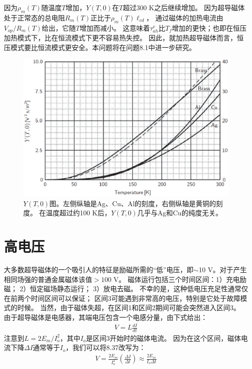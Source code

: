 因为$\rho_m(T)$随温度$T$增加，$Y(T,0)$在$T$超过300 K之后继续增加。
因为超导磁体处于正常态的总电阻$R_m(T)$正比于$\rho_m(T)\ell_{cd}$，
通过磁体的加热电流由$V_{op}/R_m(T)$给出，它随$T$增加而减小。
这意味着$\tau_{ah}^v$比$T_f$增加的更快；也即在恒压加热模式下，比在恒流模式下更不容易热失控。
因此，就加热超导磁体而言，恒压模式要比恒流模式更安全。本问题将在问题8.1中进一步研究。

\begin{figure}
	\centering
	\includegraphics[scale=0.6]{chpt8/figs/fig8.6.eps}
	\caption{$Y(T,0)$图。左侧纵轴是Ag、Cu、Al的刻度，右侧纵轴是黄铜的刻度。
	在温度超过约100 K后，$Y(T,0)$几乎与Ag和Cu的纯度无关。}
\end{figure}



\section{高电压}
大多数超导磁体的一个吸引人的特征是励磁所需的“低”电压，即$\sim$10 V。对于产生相同场强的普通金属磁体该值$>100$ V。
磁体运行包括三个时间区间：1）充电励磁； 2）恒定磁场静态运行； 3）放电去磁。 
不幸的是，这种低电压充足性通常仅在前两个时间区间可以保证；
区间3可能遇到非常高的电压，特别是它处于故障模式的时候。
 当然，由于磁体失超，在区间1和区间2期间可能会突然进入区间3。
 由于超导磁体是电感器，其端电压包含一个电感分量，由下式给出：
 \begin{align}
V=L\frac{dI}{dt}
 \end{align}
注意到$L=2E_m/I_o^2$，其中$I_o$是区间3开始时的磁体电流。
因为在这个区间，磁体电流下降$\Delta I$通常等于$I_o$，我们可以将8.37改写为：
\begin{align*}
V=\frac{2E_m}{I_{o}^{2}}\left(\frac{\Delta I}{\Delta t}\right)\approx\frac{2E_m}{I_o\Delta t}\tag{8.37b}
\end{align*}

